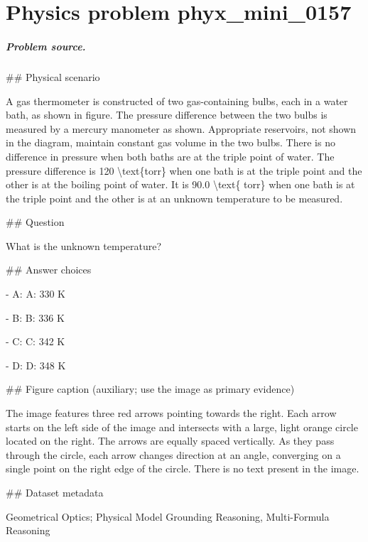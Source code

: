 
\chapter{Physics problem phyx\_mini\_0157}
\label{ch:PhyXMiniProblems_problem_phyx_mini_0157}

\paragraph{Problem source.}
\#\# Physical scenario

A gas thermometer is constructed of two gas-containing bulbs, each in a water bath, as shown in figure. The pressure difference between the two bulbs is measured by a mercury manometer as shown. Appropriate reservoirs, not shown in the diagram, maintain constant gas volume in the two bulbs. There is no difference in pressure when both baths are at the triple point of water. The pressure difference is 120 \textbackslash{}text\{torr\} when one bath is at the triple point and the other is at the boiling point of water. It is 90.0 \textbackslash{}text\{ torr\} when one bath is at the triple point and the other is at an unknown temperature to be measured.

\#\# Question

What is the unknown temperature?

\#\# Answer choices

- A: A: 330 K

- B: B: 336 K

- C: C: 342 K

- D: D: 348 K

\#\# Figure caption (auxiliary; use the image as primary evidence)

The image features three red arrows pointing towards the right. Each arrow starts on the left side of the image and intersects with a large, light orange circle located on the right. The arrows are equally spaced vertically. As they pass through the circle, each arrow changes direction at an angle, converging on a single point on the right edge of the circle. There is no text present in the image.

\#\# Dataset metadata

Geometrical Optics; Physical Model Grounding Reasoning, Multi-Formula Reasoning

